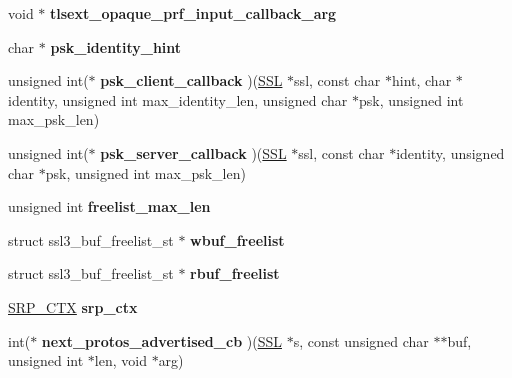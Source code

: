 \begin{DoxyCompactItemize}
\item 
\mbox{\label{structssl__ctx__st_a256ac8f414a4bbf80a5ee4ca1f2df89c}} 
void $\ast$ {\bfseries tlsext\+\_\+opaque\+\_\+prf\+\_\+input\+\_\+callback\+\_\+arg}
\item 
\mbox{\label{structssl__ctx__st_a8834b3e8d91529f7339f8648d20a884b}} 
char $\ast$ {\bfseries psk\+\_\+identity\+\_\+hint}
\item 
\mbox{\label{structssl__ctx__st_aea631f9715f6e5af8ba0194353782229}} 
unsigned int($\ast$ {\bfseries psk\+\_\+client\+\_\+callback} )(\hyperlink{structssl__st}{S\+SL} $\ast$ssl, const char $\ast$hint, char $\ast$identity, unsigned int max\+\_\+identity\+\_\+len, unsigned char $\ast$psk, unsigned int max\+\_\+psk\+\_\+len)
\item 
\mbox{\label{structssl__ctx__st_a2102c8eaff09b0b5d9e1d89e8c4d27dc}} 
unsigned int($\ast$ {\bfseries psk\+\_\+server\+\_\+callback} )(\hyperlink{structssl__st}{S\+SL} $\ast$ssl, const char $\ast$identity, unsigned char $\ast$psk, unsigned int max\+\_\+psk\+\_\+len)
\item 
\mbox{\label{structssl__ctx__st_ac7e703cc2f4d778d8c27cae612975ddb}} 
unsigned int {\bfseries freelist\+\_\+max\+\_\+len}
\item 
\mbox{\label{structssl__ctx__st_a523c86950f05f20b48fa4e21b39f216f}} 
struct ssl3\+\_\+buf\+\_\+freelist\+\_\+st $\ast$ {\bfseries wbuf\+\_\+freelist}
\item 
\mbox{\label{structssl__ctx__st_a5e371436a68dffc99cab280da6b8f65b}} 
struct ssl3\+\_\+buf\+\_\+freelist\+\_\+st $\ast$ {\bfseries rbuf\+\_\+freelist}
\item 
\mbox{\label{structssl__ctx__st_a337f1046f4778a8835a72230f2c1f138}} 
\hyperlink{structsrp__ctx__st}{S\+R\+P\+\_\+\+C\+TX} {\bfseries srp\+\_\+ctx}
\item 
\mbox{\label{structssl__ctx__st_adb86f747421d5b58cf4bb5a49e2852bf}} 
int($\ast$ {\bfseries next\+\_\+protos\+\_\+advertised\+\_\+cb} )(\hyperlink{structssl__st}{S\+SL} $\ast$s, const unsigned char $\ast$$\ast$buf, unsigned int $\ast$len, void $\ast$arg)
$$
\end{DoxyCompactItemize}
